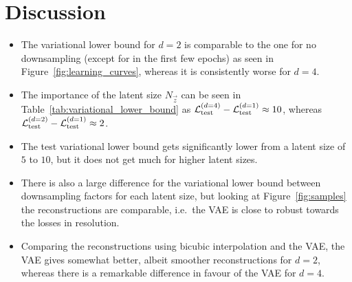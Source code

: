 \section{Discussion}
\label{sec:discussion}

\begin{itemize}
	\item The variational lower bound for $d = 2$ is comparable to the one for no downsampling (except for in the first few epochs) as seen in Figure~\ref{fig:learning_curves}, whereas it is consistently worse for $d = 4$.
	\item The importance of the latent size $N_{\vec{z}}$ can be seen in Table~\ref{tab:variational_lower_bound} as $\mathcal{L}_{\text{test}}^{(d = 4)} - \mathcal{L}_{\text{test}}^{(d = 1)} \approx 10$, whereas $\mathcal{L}_{\text{test}}^{(d = 2)} - \mathcal{L}_{\text{test}}^{(d = 1)} \approx 2$.
	\item The test variational lower bound gets significantly lower from a latent size of $5$ to $10$, but it does not get much for higher latent sizes.
	\item There is also a large difference for the variational lower bound between downsampling factors for each latent size, but looking at Figure~\ref{fig:samples} the reconstructions are comparable, i.e.\ the VAE is close to robust towards the losses in resolution.
	\item Comparing the reconstructions using bicubic interpolation and the VAE, the VAE gives somewhat better, albeit smoother reconstructions for $d = 2$, whereas there is a remarkable difference in favour of the VAE for $d = 4$.
\end{itemize}
